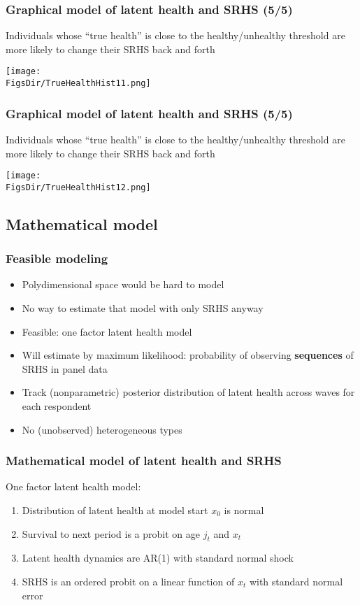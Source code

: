 \documentclass[aspectratio=169]{beamer}
\newcommand{\FigsDir}{../Figures}
\begin{document}
\begin{frame}\frametitle{Graphical model of latent health and SRHS (5/5)}
Individuals whose ``true health'' is close to the healthy/unhealthy threshold are more likely to change their SRHS back and forth
\begin{center}
	\texttt{[image: \\FigsDir/TrueHealthHist11.png]}
\end{center}
\end{frame}

\begin{frame}\frametitle{Graphical model of latent health and SRHS (5/5)}
Individuals whose ``true health'' is close to the healthy/unhealthy threshold are more likely to change their SRHS back and forth
\begin{center}
	\texttt{[image: \\FigsDir/TrueHealthHist12.png]}
\end{center}
\end{frame}


\subsection{Mathematical model}


\begin{frame}\frametitle{Feasible modeling}
\begin{itemize}
	\item <1->Polydimensional space would be hard to model
	
	\item <1->No way to estimate that model with only SRHS anyway
	
	\item <2->Feasible: one factor latent health model
	
	\item <3->Will estimate by maximum likelihood: probability of observing \textbf{sequences} of SRHS in panel data
	
	\item <3->Track (nonparametric) posterior distribution of latent health across waves for each respondent
	
	\item <4->No (unobserved) heterogeneous types
\end{itemize}
\end{frame}


\begin{frame}\frametitle{Mathematical model of latent health and SRHS}
One factor latent health model:
\begin{enumerate}
	\item <1->Distribution of latent health at model start $x_0$ is normal
	
	\item <2->Survival to next period is a probit on age $j_t$ and $x_t$
	
	\item <3->Latent health dynamics are AR(1) with standard normal shock
	
	\item <4->SRHS is an ordered probit on a linear function of $x_t$ with standard normal error
\end{enumerate}
\end{frame}
\end{document}
